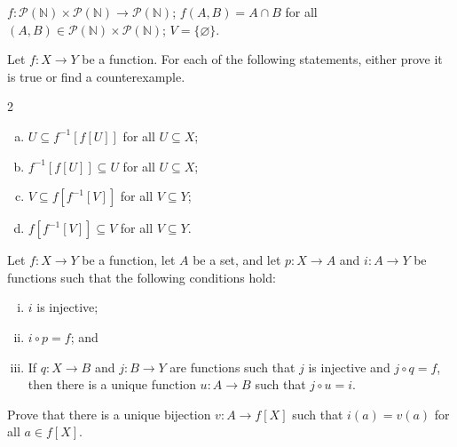 \begin{chapex}
\label{cqComputePreimageEnd}
$f : \mathcal{P}(\mathbb{N}) \times \mathcal{P}(\mathbb{N}) \to \mathcal{P}(\mathbb{N})$; $f(A,B) = A \cap B$ for all $(A,B) \in \mathcal{P}(\mathbb{N}) \times \mathcal{P}(\mathbb{N})$; $V = \{ \varnothing \}$.
\end{chapex}

\begin{chapex}
Let $f : X \to Y$ be a function. For each of the following statements, either prove it is true or find a counterexample.
\begin{multicols}{2}
\begin{enumerate}[(a)]
\item $U \subseteq f^{-1}[f[U]]$ for all $U \subseteq X$;
\item $f^{-1}[f[U]] \subseteq U$ for all $U \subseteq X$;
\item $V \subseteq f[f^{-1}[V]]$ for all $V \subseteq Y$;
\item $f[f^{-1}[V]] \subseteq V$ for all $V \subseteq Y$.
\end{enumerate}
\end{multicols}
\end{chapex}

\begin{chapex}
\label{cqUniversalPropertyOfImage}
Let $f : X \to Y$ be a function, let $A$ be a set, and let $p : X \to A$ and $i : A \to Y$ be functions such that the following conditions hold:
\begin{enumerate}[(i)]
\item $i$ is injective;
\item $i \circ p = f$; and
\item If $q : X \to B$ and $j : B \to Y$ are functions such that $j$ is injective and $j \circ q = f$, then there is a unique function $u : A \to B$ such that $j \circ u = i$.
\end{enumerate}
Prove that there is a unique bijection $v : A \to f[X]$ such that $i(a)=v(a)$ for all $a \in f[X]$.
\end{chapex}

